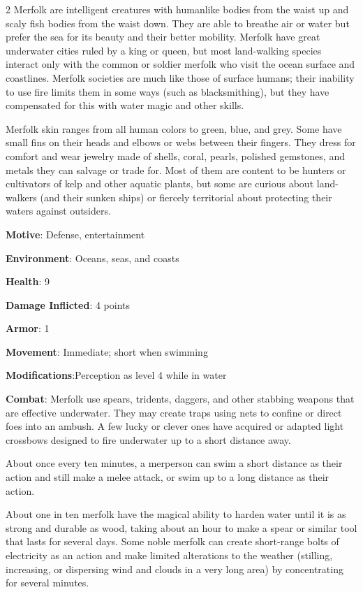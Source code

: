\begin{multicols}{2}
Merfolk are intelligent creatures with humanlike bodies from the waist up and scaly fish bodies from the waist down. They are able to breathe air or water but prefer the sea for its beauty and their better mobility. Merfolk have great underwater cities ruled by a king or queen, but most land-walking species interact only with the common or soldier merfolk who visit the ocean surface and coastlines. Merfolk societies are much like those of surface humans; their inability to use fire limits them in some ways (such as blacksmithing), but they have compensated for this with water magic and other skills. 

Merfolk skin ranges from all human colors to green, blue, and grey. Some have small fins on their heads and elbows or webs between their fingers. They dress for comfort and wear jewelry made of shells, coral, pearls, polished gemstones, and metals they can salvage or trade for. Most of them are content to be hunters or cultivators of kelp and other aquatic plants, but some are curious about land-walkers (and their sunken ships) or fiercely territorial about protecting their waters against outsiders. 

\textbf{Motive}: Defense, entertainment 

\textbf{Environment}: Oceans, seas, and coasts

\textbf{Health}: 9 

\textbf{Damage Inflicted}: 4 points 

\textbf{Armor}: 1 

\textbf{Movement}: Immediate; short when swimming 

\textbf{Modifications}:Perception as level 4 while in water 

\textbf{Combat}: Merfolk use spears, tridents, daggers, and other stabbing weapons that are effective underwater. They may create traps using nets to confine or direct foes into an ambush. A few lucky or clever ones have acquired or adapted light crossbows designed to fire underwater up to a short distance away. 

About once every ten minutes, a merperson can swim a short distance as their action and still make a melee attack, or swim up to a long distance as their action. 

About one in ten merfolk have the magical ability to harden water until it is as strong and durable as wood, taking about an hour to make a spear or similar tool that lasts for several days. Some noble merfolk can create short-range bolts of electricity as an action and make limited alterations to the weather (stilling, increasing, or dispersing wind and clouds in a very long area) by concentrating for several minutes. 


\end{multicols}
